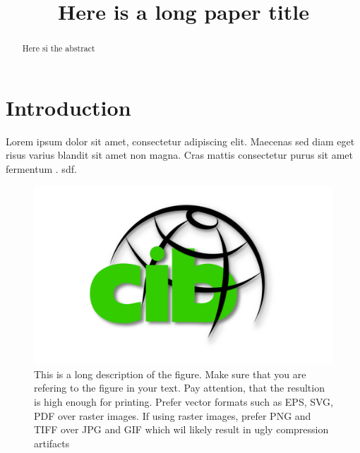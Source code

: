 
\geometry{top=3cm, bottom=2.5cm, left=3cm, right=3cm} %

\title{Here is a long paper title} 

\newcommand{\shorttitle}{My Short Paper Title}
\newcommand{\authorname}{Your Name}



\maketitle


\begin{abstract}
Here si the abstract
\end{abstract}

\thispagestyle{empty}

\section{Introduction}
Lorem ipsum dolor sit amet, consectetur adipiscing elit. Maecenas sed diam eget risus varius blandit sit amet non magna. Cras mattis consectetur purus sit amet fermentum \parencite{sample_citation1}. sdf.
\lipsum[5]
\begin{figure}[ht]
  \centering
  \includegraphics[width=\textwidth]{img/CIB_logo_gross.png}

  \caption{This is a long description of the figure. Make sure that 
  you are refering to the figure in your text. Pay attention, that the resultion is high enough for printing. Prefer vector formats such as EPS, SVG, PDF over raster images. If using raster images, prefer PNG and TIFF over JPG and GIF which wil likely result in ugly compression artifacts} 
\end{figure}

